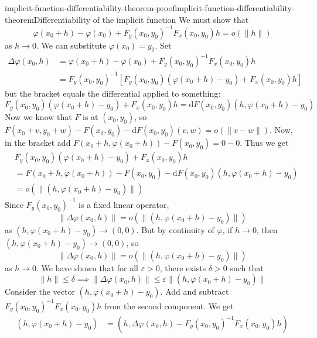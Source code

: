 \documentclass[preview]{standalone}
\begin{document}
\begin{snippetproof}{implicit-function-differentiability-theorem-proof}{implicit-function-differentiability-theorem}{Differentiability of the implicit function}
    We must show that
    \[
        \varphi(x_0 + h) - \varphi(x_0) + F_y(x_0, y_0)^{-1} F_x(x_0, y_0)h = o(\|h\|)
    \]
    as \(h \to 0\).
    We can substitute \(\varphi(x_0) = y_0\).
    Set
    \begin{align*}
        \Delta \varphi(x_0, h) &= \varphi(x_0 + h) - \varphi(x_0) + F_y(x_0, y_0)^{-1} F_x(x_0, y_0)h \\
        &= F_y(x_0, y_0)^{-1} \left[
            F_y(x_0, y_0)(\varphi(x_0 + h) - y_0) + F_x(x_0, y_0)h
        \right]
    \end{align*}
    but the bracket equals the differential applied to something:
    \[
        F_y(x_0, y_0)(\varphi(x_0 + h) - y_0) + F_x(x_0, y_0)h
        = \text{d}F(x_0, y_0)(h, \varphi(x_0 + h) - y_0)
    \]
    Now we know that \(F\) is \differentiable at \((x_0, y_0)\),
    so \(F(x_0 + v, y_0 + w) - F(x_0, y_0) - \text{d}F(x_0, y_0)(v, w) = o(\|v - w\|)\).
    Now, in the bracket add \(F(x_0 + h, \varphi(x_0 + h)) - F(x_0, y_0) = 0 - 0\).
    Thus we get
    \begin{align*}
        &F_y(x_0, y_0)(\varphi(x_0 + h) - y_0) + F_x(x_0, y_0)h \\
        &= F(x_0 + h, \varphi(x_0 + h)) - F(x_0, y_0) - \text{d}F(x_0, y_0)(h, \varphi(x_0 + h) - y_0) \\
        &= o(\|(h, \varphi(x_0 + h) - y_0)\|)
    \end{align*}
    Since \(F_y(x_0, y_0)^{-1}\) is a fixed linear operator,
    \[
        \|\Delta \varphi(x_0, h)\| = o(\|(h, \varphi(x_0 + h) - y_0)\|)
    \]
    as \((h, \varphi(x_0 + h) - y_0) \to (0, 0)\).
    But by continuity of \(\varphi\), if \(h \to 0\), then \((h, \varphi(x_0 + h) - y_0) \to (0, 0)\), so
    \[
        \|\Delta \varphi(x_0, h)\| = o(\|(h, \varphi(x_0 + h) - y_0)\|)
    \]
    as \(h \to 0\).
    We have shown that for all \(\varepsilon > 0\), there exists \(\delta > 0\) such that
    \[
        \|h\| \leq \delta \implies \|\Delta \varphi(x_0, h)\| \leq \varepsilon \|(h, \varphi(x_0 + h) - y_0)\|
    \]
    Consider the vector \((h, \varphi(x_0 + h) - y_0)\). Add and subtract \(F_y(x_0, y_0)^{-1}F_x(x_0, y_0)h\)
    from the second component. We get
    \begin{align*}
        (h, \varphi(x_0 + h) - y_0) &= (h, \Delta \varphi(x_0, h) - F_y(x_0, y_0)^{-1}F_x(x_0, y_0)h) \\

\end{align*}
\end{snippetproof}
\end{document}
